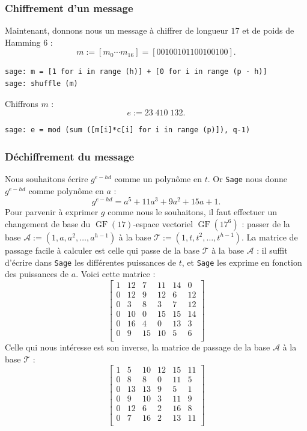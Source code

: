 \documentclass[a4paper, titlepage]{article}
\theoremstyle{definition}
\theoremstyle{remark}
\def\gf{\operatorname{GF}}
\begin{document}
\subsubsection{Chiffrement d'un message}
Maintenant, donnons nous un message à chiffrer de longueur $17$ et de poids de Hamming $6$ :
$$m := [m_0\cdots m_{16}] = [00100101100100100].$$
\begin{verbatim}
sage: m = [1 for i in range (h)] + [0 for i in range (p - h)]
sage: shuffle (m)
\end{verbatim}
Chiffrons $m$ :
$$e := 23\;410\;132.$$
\begin{verbatim}
sage: e = mod (sum ([m[i]*c[i] for i in range (p)]), q-1)
\end{verbatim}

\subsubsection{Déchiffrement du message}
Nous souhaitons écrire $g^{e - hd}$ comme un polynôme en $t$. Or \verb|Sage| nous donne $g^{e - hd}$ comme polynôme en $a$ : $$g^{e - hd} = a^5 + 11a^3 + 9a^2 + 15a + 1.$$
Pour parvenir à exprimer $g$ comme nous le souhaitons, il faut effectuer un changement de base du $\gf(17)$-espace vectoriel $\gf(17^6)$ : passer de la base $\mathcal{A} := (1, a, a^2, \dots, a^{h-1})$ à la base $\mathcal{T} := (1, t, t^2, \dots, t^{h-1})$.
La matrice de passage facile à calculer est celle qui passe de la base $\mathcal{T}$ à la base $\mathcal{A}$ : il suffit d'écrire dans \verb|Sage| les différentes puissances de $t$, et \verb|Sage| les exprime en fonction des puissances de $a$. Voici cette matrice :
$$\left[\begin{array}{cccccc}
1 & 12 & 7 & 11 & 14 & 0 \\
0 & 12 & 9 & 12 & 6 & 12 \\
0 & 3 & 8 & 3 & 7 & 12 \\
0 & 10 & 0 & 15 & 15 & 14 \\
0 & 16 & 4 & 0 & 13 & 3 \\
0 & 9 & 15 & 10 & 5 & 6 \\
\end{array}\right]$$
Celle qui nous intéresse est son inverse, la matrice de passage de la base $\mathcal{A}$ à la base $\mathcal{T}$ :
$$\left[\begin{array}{cccccc}
1 & 5 & 10 & 12 & 15 & 11 \\
0 & 8 & 8 & 0 & 11 & 5 \\
0 & 13 & 13 & 9 & 5 & 1 \\
0 & 9 & 10 & 3 & 11 & 9 \\
0 & 12 & 6 & 2 & 16 & 8 \\
0 & 7 & 16 & 2 & 13 & 11 \\
\end{array}\right]$$
\end{document}
